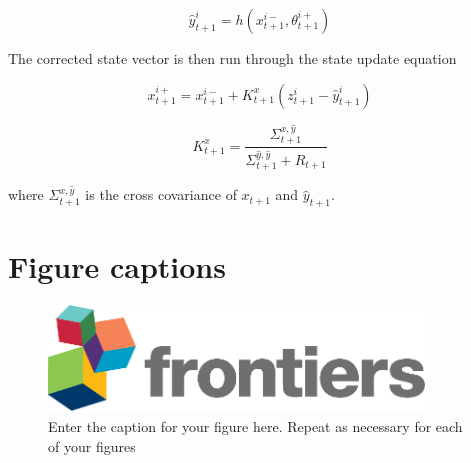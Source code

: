 \documentclass[utf8]{frontiersSCNS} %
\begin{document}
\begin{equation}\label{eq:dekf_pred_2}
\hat{y}_{t+1}^{i} = h(x_{t+1}^{i-}, \theta_{t+1}^{i+})
\end{equation}

The corrected state vector is then run through the state update equation

\begin{equation}\label{eq:dekf_state_update}
x_{t+1}^{i+} = x_{t+1}^{i-} + K_{t+1}^{x}(z_{t+1}^{i}-\hat{y}_{t+1}^{i})
\end{equation}
 
\begin{equation}\label{eq:dekf_param_k}
K_{t+1}^{x} = \frac{\Sigma^{x,\hat{y}}_{t+1}}{\Sigma^{\hat{y},\hat{y}}_{t+1} + R_{t+1}}
\end{equation}

where $\Sigma^{x,\hat{y}}_{t+1}$ is the cross covariance of $x_{t+1}$ and $\hat{y}_{t+1}$.







\section*{Figure captions}


\begin{figure}[h!]
\begin{center}
\includegraphics[width=10cm]{logo1}%
\end{center}
\caption{ Enter the caption for your figure here.  Repeat as  necessary for each of your figures}\label{fig:1}
\end{figure}
\end{document}
